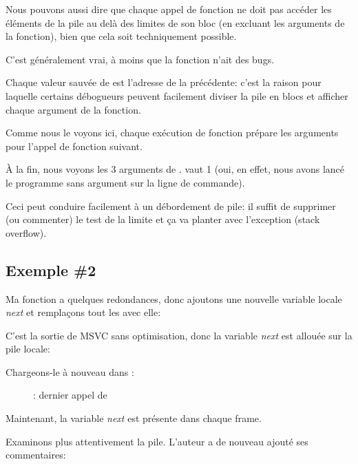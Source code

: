 Nous pouvons aussi dire que chaque appel de fonction ne doit pas accéder les éléments
de la pile au delà des limites de son bloc (en excluant les arguments de la fonction),
bien que cela soit techniquement possible.

C'est généralement vrai, à moins que la fonction n'ait des bugs.

Chaque valeur sauvée de \EBP est l'adresse de la  précédente:
c'est la raison pour laquelle certains débogueurs peuvent facilement diviser la pile
en blocs et afficher chaque argument de la fonction.

Comme nous le voyons ici, chaque exécution de fonction prépare les arguments pour
l'appel de fonction suivant.

À la fin, nous voyons les 3 arguments de \main.
 vaut 1 (oui, en effet, nous avons lancé le programme sans argument sur
la ligne de commande).

Ceci peut conduire facilement à un débordement de pile: il suffit de supprimer (ou
commenter) le test de la limite et ça va planter avec l'exception  (stack overflow).

\subsection{Exemple \#2}

Ma fonction a quelques redondances, donc ajoutons une nouvelle variable locale \emph{next}
et remplaçons tout les  avec elle:



C'est la sortie de MSVC sans optimisation, donc la variable \emph{next} est allouée
sur la pile locale:



\clearpage
Chargeons-le à nouveau dans \olly:

\begin{figure}[H]
\centering
{}
\caption{\olly: dernier appel de \ttf{}}
\label{fig:fib_olly2}
\end{figure}

Maintenant, la variable \emph{next} est présente dans chaque frame.

\clearpage

Examinons plus attentivement la pile. L'auteur a de nouveau ajouté ses commentaires:

